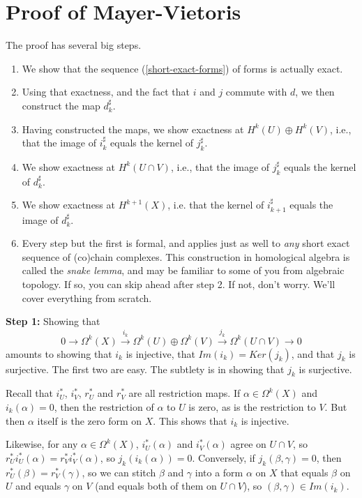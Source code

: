 \documentclass[12pt]{amsbook}
\theoremstyle{definition}
\begin{document}
\section{Proof of Mayer-Vietoris}

The proof has several big steps.
\begin{enumerate}
\item We show that the sequence 
(\ref{short-exact-forms}) of forms is actually exact. 
\item Using that 
exactness, and the fact that $i$ and $j$ commute with $d$, we then construct
the map $d_k^\sharp$. 
\item Having constructed the maps, we show exactness at $H^k(U)\oplus H^k(V)$, i.e., 
that the image of $i_k^\sharp$
equals the kernel of $j_k^\sharp$.
\item We show exactness at $H^k(U\cap V)$, i.e., that the image
of $j_k^\sharp$ equals the kernel of $d_k^\sharp$. 
\item We show exactness at 
$H^{k+1}(X)$, i.e. that the kernel of $i_{k+1}^\sharp$ equals the image of 
$d_{k}^\sharp$.
\item Every step but the first is formal, and applies just as well to 
{\em any} short exact sequence of (co)chain complexes. This construction 
in homological algebra is called the {\em snake lemma}, and may be familiar
to some of you from algebraic topology. If so, you can skip ahead after 
step 2. If not, don't worry. We'll cover everything from scratch. 
\end{enumerate}

{\bf Step 1:}
Showing that $$ 0 \rightarrow \Omega^k(X) \xrightarrow {i_k}
\Omega^k(U) \oplus \Omega^k(V) \xrightarrow {j_k} \Omega^k(U \cap V) \rightarrow
0$$
amounts to showing that $i_k$ is injective, 
that $Im(i_k)=Ker(j_k)$, and that $j_k$ is surjective. 
The first two are easy. The subtlety is in showing that $j_k$ is surjective.

Recall that $i_U^*$, $i_V^*$, $r_U^*$ and $r_V^*$ are all restriction maps.
If $\alpha \in \Omega^k(X)$ and $i_k(\alpha)=0$,
then the restriction of $\alpha$ to $U$ is zero, as is the restriction to $V$.
But then $\alpha$ itself is the zero form on $X$. This shows that $i_k$ is 
injective. 

Likewise, for any $\alpha \in \Omega^k(X)$, $i_U^*(\alpha)$ and $i_V^*(\alpha)$
agree on $U \cap V$, so $r_U^*i_U^*(\alpha)=r_V^*i_V^*(\alpha)$, so 
$j_k(i_k(\alpha))=0$. Conversely, if $j_k(\beta,\gamma)=0$, then $r_U^*(\beta)=
r_V^*(\gamma)$, so we can stitch $\beta$ and $\gamma$ into a form $\alpha$ on
$X$ that equals $\beta$ on $U$ and equals $\gamma$ on $V$ (and equals both
of them on $U\cap V$), so $(\beta,\gamma) \in Im(i_k)$. 
\end{document}
